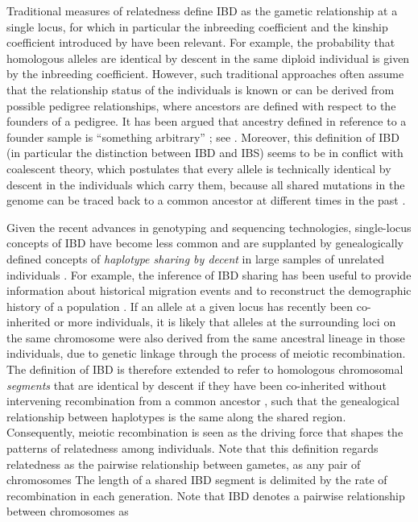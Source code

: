 Traditional measures of relatedness define IBD as the gametic relationship at a single locus, for which in particular the inbreeding coefficient and the kinship coefficient introduced by \citet{Wright:1921tk,Wright:1922cr} have been relevant.
For example, the probability that  homologous alleles are identical by descent in the same diploid individual is given by the inbreeding coefficient.
However, such traditional approaches often assume that the relationship status of the individuals is known or can be derived from possible pedigree relationships, where ancestors are defined with respect to the founders of a pedigree.
It has been argued that ancestry defined in reference to a founder sample is ``something arbitrary'' \citep[][p~141]{maynardsmith1989}; see \citet{Rousset:2002bz}.
Moreover, this definition of IBD (in particular the distinction between IBD and IBS) seems to be in conflict with coalescent theory, which postulates that every allele is technically identical by descent in the individuals which carry them, because all shared mutations in the genome can be traced back to a common ancestor at different times in the past \citep{Powell:2010di}.

Given the recent advances in genotyping and sequencing technologies, single-locus concepts of IBD have become less common and are supplanted by genealogically defined concepts of \emph{haplotype sharing by decent} in large samples of unrelated individuals \citep{Thompson:2013cj,Wakeley2016book}.
For example, the inference of IBD sharing has been useful to provide information about historical migration events and to reconstruct the demographic history of a population \citep{Palamara:2012cya,Palamara:2013eg,Harris:2013id}.
If an allele at a given locus has recently been co-inherited  or more individuals, it is likely that alleles at the surrounding loci on the same chromosome were also derived from the same ancestral lineage in those individuals, due to genetic linkage through the process of meiotic recombination.
The definition of IBD is therefore extended to refer to  homologous chromosomal \emph{segments} that are identical by descent if they have been co-inherited without intervening recombination from a common ancestor \citep{Hayes:2003gj,Powell:2010di}, such that the genealogical relationship between  haplotypes is the same along the shared region.
Consequently, meiotic recombination is seen as the driving force that shapes the patterns of relatedness among individuals.
Note that this definition regards relatedness as the pairwise relationship between  gametes, as any pair of chromosomes
The length of a shared IBD segment is delimited by the rate of recombination in each generation.
Note that IBD denotes a pairwise relationship between chromosomes as

